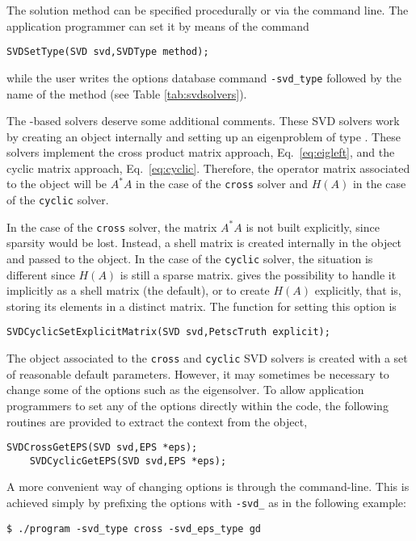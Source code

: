 The solution method can be specified procedurally or via the command line. The application programmer can set it by means of the command
	\begin{Verbatim}[fontsize=\small]
	SVDSetType(SVD svd,SVDType method);
	\end{Verbatim}
while the user writes the options database command \Verb!-svd_type! followed by the name of the method (see Table \ref{tab:svdsolvers}).

The -based solvers deserve some additional comments. These SVD solvers work by creating an  object internally and setting up an eigenproblem of type . These solvers implement the cross product matrix approach, Eq.\ \ref{eq:eigleft}, and the cyclic matrix approach, Eq.\ \ref{eq:cyclic}. Therefore, the operator matrix associated to the  object will be $A^*A$ in the case of the \texttt{cross} solver and $H(A)$ in the case of the \texttt{cyclic} solver.

In the case of the \texttt{cross} solver, the matrix $A^*A$ is not built explicitly, since sparsity would be lost. Instead, a shell matrix is created internally in the  object and passed to the  object. In the case of the \texttt{cyclic} solver, the situation is different since $H(A)$ is still a sparse matrix. \slepc gives the possibility to handle it implicitly as a shell matrix (the default), or to create $H(A)$ explicitly, that is, storing its elements in a distinct matrix. The function for setting this option is
	\begin{Verbatim}[fontsize=\small]
	SVDCyclicSetExplicitMatrix(SVD svd,PetscTruth explicit);
	\end{Verbatim}

The  object associated to the \texttt{cross} and \texttt{cyclic} SVD solvers is created with a set of reasonable default parameters. However, it may sometimes be necessary to change some of the  options such as the eigensolver. To allow application programmers to set any of the  options directly within the code, the following routines are provided to extract the  context from the  object,
	\begin{Verbatim}[fontsize=\small]
	SVDCrossGetEPS(SVD svd,EPS *eps);
	SVDCyclicGetEPS(SVD svd,EPS *eps);
	\end{Verbatim}
A more convenient way of changing  options is through the command-line. This is achieved simply by prefixing the  options with \texttt{-svd\_} as in the following example:
\begin{Verbatim}[fontsize=\small]
	$ ./program -svd_type cross -svd_eps_type gd
\end{Verbatim}

